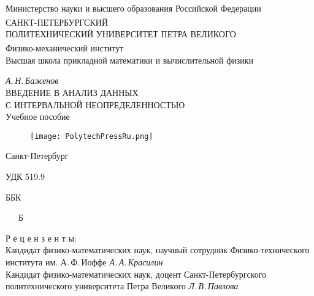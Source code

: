 \documentclass[a5paper,openany]{book}
\newcommand{\ov}{\overline}
\begin{document}

\begin{center}
	\hfill \break
Министерство науки и высшего образования  Российской Федерации\\
$\ov{~~~~~~~~~~~~~~~~~~~~~~~}$\\
	\normalsize{	САНКТ-ПЕТЕРБУРГСКИЙ \\
		ПОЛИТЕХНИЧЕСКИЙ УНИВЕРСИТЕТ ПЕТРА ВЕЛИКОГО}\\ 
$\ov{~~~~~~~~~~~~~~~~~~~~~~~~~~~~~~~~~~~~~~~~~~~~~~~~~~~~~~~~~~~~~~~~~~~~~~~~~~~~~~~~~~~~~~~~~~~~~~}$\\	
	Физико-механический институт\\
	Высшая школа прикладной математики и вычислительной физики\\
	\hfill \break
	
	
	
	
	
	\Large{\it А.\,Н.\,Баженов\\
		\hfill \break		\hfill \break		}
	{\Large	ВВЕДЕНИЕ В АНАЛИЗ ДАННЫХ\\
		С ИНТЕРВАЛЬНОЙ НЕОПРЕДЕЛЕННОСТЬЮ}\\
	\hfill \break 	\hfill \break	
	\Large{	Учебное пособие	
	}\\
\end{center}

		\hfill \break		\hfill \break	
\begin{figure}[h]
	\centering
	\texttt{[image: PolytechPressRu.png]}
\end{figure}
\begin{center}\Large{Санкт-Петербург \\
		\hfill {}} \end{center}
\thispagestyle{empty} %


\newpage
УДК 519.9

ББК

~~~Б


\begin{center}
Р е ц е н з е н т ы:\\

Кандидат физико-математических наук, научный сотрудник Физико-технического института им. А.\,Ф.\,Иоффе
{\it А.\,А.\,Красилин}\\
Кандидат физико-математических наук, доцент Санкт-Петербургского политехнического  университета Петра Великого {\it Л.\,В.\,Павлова}
 \end{center}
\end{document}
